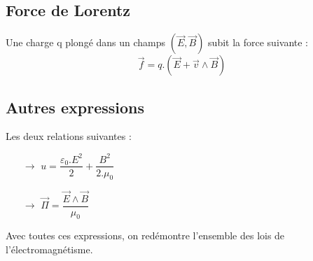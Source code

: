 \subsection{Force de Lorentz}
Une charge q plongé dans un champs $(\overrightarrow{E},\overrightarrow{B})$ subit la force suivante : 
$$\overrightarrow{f} = q.(\overrightarrow{E} + \overrightarrow{v}\wedge\overrightarrow{B})$$
\subsection{Autres expressions}
Les deux relations suivantes : 
\begin{itemize}
 \item[$\rightarrow$] $u = \dfrac{\varepsilon_0.E^2}{2} + \dfrac{B^2}{2.\mu_0}$
 \item[$\rightarrow$] $\overrightarrow{\Pi} = \dfrac{\overrightarrow{E}\wedge\overrightarrow{B}}{\mu_0}$ 
\end{itemize}
Avec toutes ces expressions, on redémontre l'ensemble des lois de l'électromagnétisme.